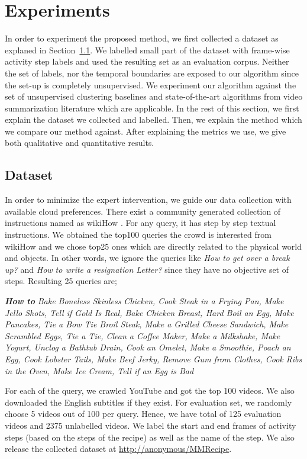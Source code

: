 \section{Experiments}
In order to experiment the proposed method, we first collected a dataset as explaned in Section~\ref{dataset:sec}. We labelled small part of the dataset with frame-wise activity step labels and used the resulting set as an evaluation corpus. Neither the set of labels, nor the temporal boundaries are exposed to our algorithm since the set-up is completely unsupervised. We experiment our algorithm against the set of unsupervised clustering baselines and state-of-the-art algorithms from video summarization literature which are applicable. In the rest of this section, we first explain the dataset we collected and labelled. Then, we explain the method which we compare our method against. After explaining the metrics we use, we give both qualitative and quantitative results.

\subsection{Dataset}
\label{dataset:sec}
In order to minimize the expert intervention, we guide our data collection with available cloud preferences. There exist a community generated collection of instructions named as wikiHow \cite{wikiHow}. For any query, it has step by step textual instructions. We obtained the top100 queries the crowd is interested from wikiHow and we chose top25 ones which are directly related to the physical world and objects. In other words, we ignore the queries like \emph{How to get over a break up‏?‎} and \emph{How to write a resignation Letter?} since they have no objective set of steps. Resulting 25 queries are;


\emph{\textbf{How to}}\footnotesize
\emph{Bake Boneless Skinless Chicken, Cook Steak in a Frying Pan, Make Jello Shots, Tell if Gold Is Real, Bake Chicken Breast, Hard Boil an Egg, Make Pancakes, Tie a Bow Tie
Broil Steak, Make a Grilled Cheese Sandwich, Make Scrambled Eggs, Tie a Tie, Clean a Coffee Maker, Make a Milkshake, Make Yogurt, Unclog a Bathtub Drain, Cook an Omelet,
Make a Smoothie, Poach an Egg, Cook Lobster Tails, Make Beef Jerky, Remove Gum from Clothes, Cook Ribs in the Oven, Make Ice Cream, Tell if an Egg is Bad}
\normalsize

For each of the query, we crawled YouTube and got the top 100 videos. We also downloaded the English subtitles if they exist. For evaluation set, we randomly choose 5 videos out of 100 per query. Hence, we have total of 125 evaluation videos and 2375 unlabelled videos. We label the start and end frames of activity steps (\ie based on the steps of the recipe) as well as the name of the step. We also release the collected dataset at \url{http://anonymous/MMRecipe}.


